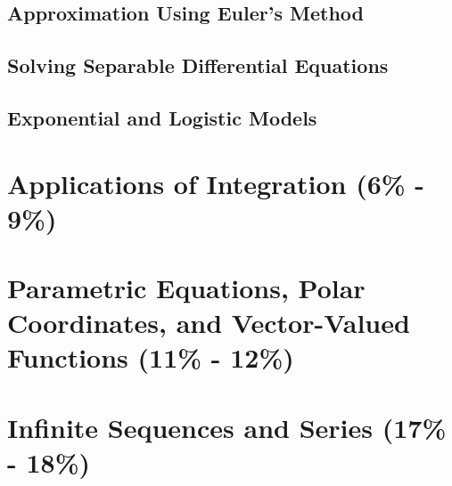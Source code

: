 \documentclass[12pt]{article}
\begin{document}
        \subsection{Approximation Using Euler's Method}

        \subsection{Solving Separable Differential Equations}

        \subsection{Exponential and Logistic Models}

    \section{Applications of Integration (6\% - 9\%)}

    \section{Parametric Equations, Polar Coordinates, and Vector-Valued Functions (11\% - 12\%)}

    \section{Infinite Sequences and Series (17\% - 18\%)}
\end{document}
